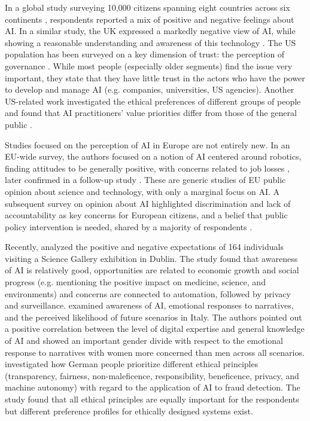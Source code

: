 \documentclass{article}
\begin{document}
In a global study surveying 10,000 citizens spanning eight countries across six continents \cite{kelley2021exciting}, respondents reported a mix of positive and negative feelings about AI. In a similar study, the UK expressed a markedly negative view of AI, while showing a reasonable understanding and awareness of this technology \cite{cave2019scary}. The US population has been surveyed on a key dimension of trust: the perception of governance \cite{zhang2019artificial,zhang2020us}. While most people (especially older segments) find the issue very important, they state that they have little trust in the actors who have the power to develop and manage AI (e.g. companies, universities, US agencies). Another US-related work investigated the ethical preferences of different groups of people and found that AI practitioners' value priorities differ from those of the general public \cite{jakesch2022different}. 

Studies focused on the perception of AI in Europe are not entirely new. In an EU-wide survey, the authors focused on a notion of AI centered around robotics, finding attitudes to be generally positive, with concerns related to job losses \cite{european2017special}, later confirmed in a follow-up study \cite{european2021special}. These are generic studies of EU public opinion about science and technology, with only a marginal focus on AI. 
A subsequent survey on opinion about AI highlighted discrimination and lack of accountability as key concerns for European citizens, and a belief that public policy intervention is needed, shared by a majority of respondents \cite{european2019}.

Recently, \cite{kerr2020expectations} analyzed the positive and negative expectations of 164 individuals visiting a Science Gallery exhibition in Dublin. The study found that awareness of AI is relatively good, opportunities are related to economic growth and social progress (e.g. mentioning the positive impact on medicine, science, and environments) and concerns are connected to automation, followed by privacy and surveillance. \cite{sartori2022} examined awareness of AI, emotional responses to narratives, and the perceived likelihood of future scenarios in Italy. The authors pointed out a positive correlation between the level of digital expertise and general knowledge of AI and showed an important gender divide with respect to the emotional response to narratives with women more concerned than men across all scenarios. \cite{kieslich2022artificial} investigated how German people prioritize different ethical principles (transparency, fairness, non-maleficence, responsibility, beneficence, privacy, and machine autonomy) with regard to the application of AI to fraud detection. The study found that all ethical principles are equally important for the respondents but different preference profiles for ethically designed systems exist. 
\end{document}
